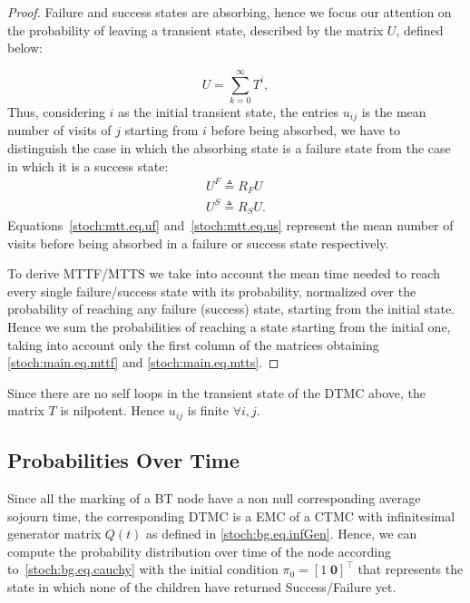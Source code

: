 \begin{proof}
Failure and success states are absorbing, hence we focus our attention on the probability of leaving a transient state, described by the matrix $U$, defined below:

\begin{equation}
U=\sum_{k=0}^\infty  T^i,
\label{stoch:bg.eq.u}
\end{equation}
Thus, considering $i$ as the initial transient state, the entries $u_{ij}$ is the mean number of visits of $j$ starting from $i$ before 
being absorbed, we have to distinguish the case in which the absorbing state is a failure state from the case in which it is a success state:
\vspace{-8pt}
\begin{eqnarray} 
U^F\triangleq R_F U
\label{stoch:mtt.eq.uf} \\
 U^S\triangleq R_S U .
\label{stoch:mtt.eq.us} 
\end{eqnarray}
Equations~\eqref{stoch:mtt.eq.uf} and~\eqref{stoch:mtt.eq.us} represent the mean number of visits before being absorbed in a failure or success state respectively.

To derive MTTF/MTTS we take into account the mean time needed to reach every single failure/success state with its probability, normalized over the probability of reaching any failure (success) state, starting from the initial state. Hence we sum the probabilities of reaching a state starting from the initial one, taking into account only the first column of the matrices obtaining \eqref{stoch:main.eq.mttf} and \eqref{stoch:main.eq.mtts}.
\end{proof}
\begin{remark}
Since there are no self loops in the transient state of the DTMC above, the matrix $T$ is nilpotent. Hence $u_{ij}$ is finite $\forall i,j$.
\end{remark}

\subsection{Probabilities Over Time} 
Since all the marking of a BT node have a non null corresponding average sojourn time, the corresponding DTMC is a EMC of a CTMC with infinitesimal generator matrix $Q(t)$ as defined in \eqref{stoch:bg.eq.infGen}. Hence, we can compute the probability distribution over time of the node according to~\eqref{stoch:bg.eq.cauchy} with the initial condition $\pi_0=[1 \;\mathbf{0}]^\top$ that represents the state in which none of the children have returned Success/Failure yet.

